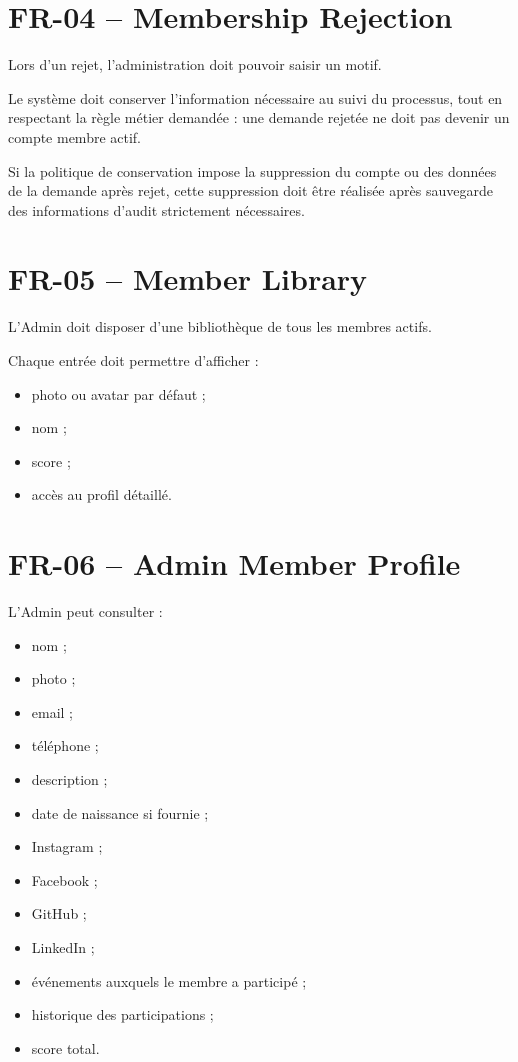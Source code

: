 \documentclass[11pt,a4paper]{report}
\begin{document}
\section{FR-04 -- Membership Rejection}

Lors d'un rejet, l'administration doit pouvoir saisir un motif.

Le système doit conserver l'information nécessaire au suivi du processus, tout en respectant la règle métier demandée : une demande rejetée ne doit pas devenir un compte membre actif.

Si la politique de conservation impose la suppression du compte ou des données de la demande après rejet, cette suppression doit être réalisée après sauvegarde des informations d'audit strictement nécessaires.

\section{FR-05 -- Member Library}

L'Admin doit disposer d'une bibliothèque de tous les membres actifs.

Chaque entrée doit permettre d'afficher :

\begin{itemize}
    \item photo ou avatar par défaut ;
    \item nom ;
    \item score ;
    \item accès au profil détaillé.
\end{itemize}

\section{FR-06 -- Admin Member Profile}

L'Admin peut consulter :

\begin{itemize}
    \item nom ;
    \item photo ;
    \item email ;
    \item téléphone ;
    \item description ;
    \item date de naissance si fournie ;
    \item Instagram ;
    \item Facebook ;
    \item GitHub ;
    \item LinkedIn ;
    \item événements auxquels le membre a participé ;
    \item historique des participations ;
    \item score total.
\end{itemize}
\end{document}

